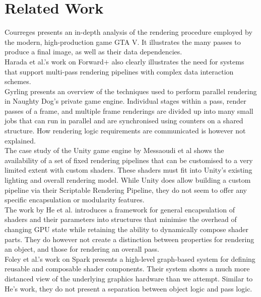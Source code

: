 \documentclass[format=sigconf]{acmart}
\begin{document}
\section{Related Work}\label{relatedwork}
Courreges\cite{gtav} presents an in-depth analysis of the rendering procedure employed by the modern, high-production game GTA V. It illustrates the many passes to produce a final image, as well as their data dependencies. \\

Harada et al.'s work on Forward+\cite{forward+}\cite{forward+talk} also clearly illustrates the need for systems that support multi-pass rendering pipelines with complex data interaction schemes. \\

Gyrling\cite{fibers} presents an overview of the techniques used to perform parallel rendering in Naughty Dog's private game engine. Individual stages within a pass, render passes of a frame, and multiple frame renderings are divided up into many small jobs that can run in parallel and are synchronised using counters on a shared structure. How rendering logic requirements are communicated is however not explained. \\

The case study of the Unity game engine by Messaoudi et al\cite{unity} shows the availability of a set of fixed rendering pipelines that can be customised to a very limited extent with custom shaders. These shaders must fit into Unity's existing lighting and overall rendering model. While Unity does allow building a custom pipeline via their Scriptable Rendering Pipeline\cite{unitycustom}, they do not seem to offer any specific encapsulation or modularity features. \\

The work by He et al.\cite{components} introduces a framework for general encapsulation of shaders and their parameters into structures that minimise the overhead of changing GPU state while retaining the ability to dynamically compose shader parts. They do however not create a distinction between properties for rendering an object, and those for rendering an overall pass. \\

Foley et al.'s work on Spark\cite{spark} presents a high-level graph-based system for defining reusable and composable shader components. Their system shows a much more distanced view of the underlying graphics hardware than we attempt. Similar to He's work, they do not present a separation between object logic and pass logic. \\
\end{document}
